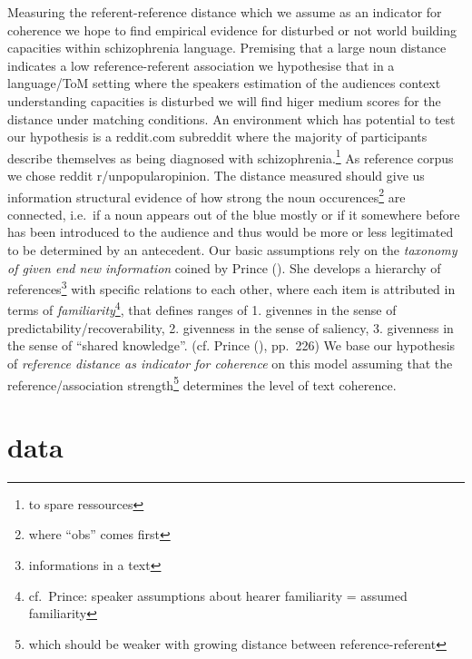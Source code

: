 \documentclass[
  12pt,
  oneside]{book}
\begin{document}
Measuring the referent-reference distance which we assume as an indicator for coherence we hope to find empirical evidence for disturbed or not world building capacities within schizophrenia language. Premising that a large noun distance indicates a low reference-referent association we hypothesise that in a language/ToM setting where the speakers estimation of the audiences context understanding capacities is disturbed we will find higer medium scores for the distance under matching conditions. An environment which has potential to test our hypothesis is a reddit.com subreddit where the majority of participants describe themselves as being diagnosed with schizophrenia.\footnote{to spare ressources} As reference corpus we chose reddit r/unpopularopinion.
The distance measured should give us information structural evidence of how strong the noun occurences\footnote{where ``obs'' comes first} are connected, i.e.~if a noun appears out of the blue mostly or if it somewhere before has been introduced to the audience and thus would be more or less legitimated to be determined by an antecedent.
Our basic assumptions rely on the \emph{taxonomy of given end new information} coined by Prince (). She develops a hierarchy of references\footnote{informations in a text} with specific relations to each other, where each item is attributed in terms of \emph{familiarity}\footnote{cf.~Prince: speaker assumptions about hearer familiarity = assumed familiarity}, that defines ranges of 1. givennes in the sense of predictability/recoverability, 2. givenness in the sense of saliency, 3. givenness in the sense of ``shared knowledge''. (cf. Prince (), pp.~226) We base our hypothesis of \emph{reference distance as indicator for coherence} on this model assuming that the reference/association strength\footnote{which should be weaker with growing distance between reference-referent} determines the level of text coherence.

\section{data}\label{data}
\end{document}
